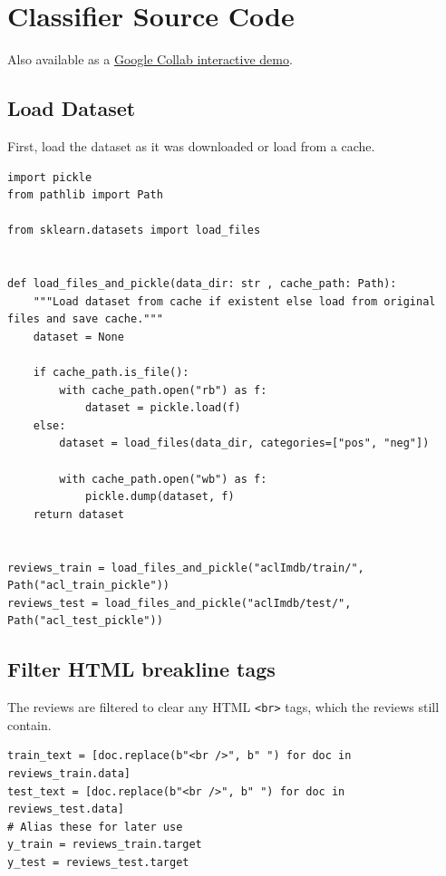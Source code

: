 \documentclass[a4paper,12pt]{article}
\begin{document}
\appendix

\section{Classifier Source Code}

Also available as a
\href{https://colab.research.google.com/drive/14lITGB2M4x2nDNeRoziTfYY5tyL5PONz?usp=sharing}{Google Collab interactive demo}.

\subsection{Load Dataset}
First, load the dataset as it was downloaded or load from a cache.

\begin{verbatim}
import pickle
from pathlib import Path

from sklearn.datasets import load_files


def load_files_and_pickle(data_dir: str , cache_path: Path):
    """Load dataset from cache if existent else load from original files and save cache."""
    dataset = None
    
    if cache_path.is_file():
        with cache_path.open("rb") as f:
            dataset = pickle.load(f)
    else:
        dataset = load_files(data_dir, categories=["pos", "neg"])
        
        with cache_path.open("wb") as f:
            pickle.dump(dataset, f)
    return dataset
            
        
reviews_train = load_files_and_pickle("aclImdb/train/", Path("acl_train_pickle"))
reviews_test = load_files_and_pickle("aclImdb/test/", Path("acl_test_pickle")) 
\end{verbatim}

\subsection{Filter HTML breakline tags}

The reviews are filtered to clear any HTML \texttt{<br>} tags, which the reviews still contain.

\begin{verbatim}
train_text = [doc.replace(b"<br />", b" ") for doc in reviews_train.data]
test_text = [doc.replace(b"<br />", b" ") for doc in reviews_test.data]
# Alias these for later use
y_train = reviews_train.target
y_test = reviews_test.target
\end{verbatim}
\end{document}
